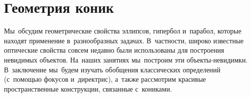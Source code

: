 
\section*{Геометрия коник}



Мы~обсудим геометрические свойства эллипсов, гипербол и~парабол, которые
находят применение в~разнообразных задачах.
В~частности, широко известные оптические свойства совсем недавно были
использованы для построения невидимых объектов.
На~наших занятиях мы~построим эти объекты-невидимки.
В~заключение мы~будем изучать обобщения классических определений (с~помощью
фокусов и~директрис), а~также рассмотрим красивые пространственные конструкции,
связанные с~кониками.


